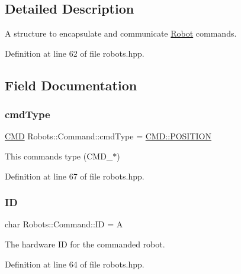 \subsection{Detailed Description}
A structure to encapsulate and communicate \hyperlink{struct_robots_1_1_robot}{Robot} commands. 

Definition at line 62 of file robots.\+hpp.



\subsection{Field Documentation}
\mbox{\label{struct_robots_1_1_command_ace080efc1d95063522142dcc8d4f6482}} 
\subsubsection{\texorpdfstring{cmd\+Type}{cmdType}}
{\footnotesize\ttfamily \hyperlink{class_robots_adcc7ae7fbb9bdc57a26ee70fa1ae88e5}{C\+MD} Robots\+::\+Command\+::cmd\+Type = \hyperlink{serial_w_8hpp_a440f0e10bb28b153f5661c934bc6b89f}{C\+M\+D\+::\+P\+O\+S\+I\+T\+I\+ON}}



This command\textquotesingle{}s type (C\+M\+D\+\_\+$\ast$) 



Definition at line 67 of file robots.\+hpp.

\mbox{\label{struct_robots_1_1_command_a8cf119f5ac1306eb061bbc284dc9583f}} 
\subsubsection{\texorpdfstring{ID}{ID}}
{\footnotesize\ttfamily char Robots\+::\+Command\+::\+ID = \textquotesingle{}A\textquotesingle{}}



The hardware ID for the commanded robot. 



Definition at line 64 of file robots.\+hpp.

\mbox{\label{struct_robots_1_1_command_a598cda1f7d4b2879d8a1435ceebbc0db}} 
